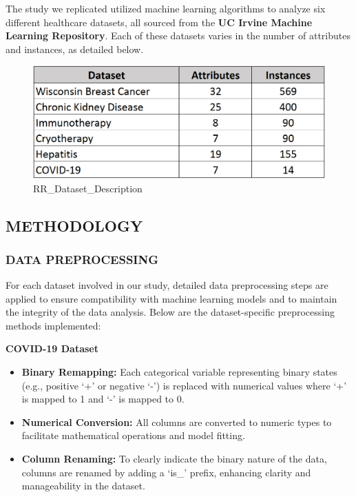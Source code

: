 \documentclass[11pt]{article}
\providecommand{\tightlist}{%
      \setlength{\itemsep}{0pt}\setlength{\parskip}{0pt}}
\begin{document}
    The study we replicated utilized machine learning algorithms to analyze
six different healthcare datasets, all sourced from the \textbf{UC
Irvine Machine Learning Repository}. Each of these datasets varies in
the number of attributes and instances, as detailed below.

    \begin{figure}
\centering
\includegraphics{images/RR_Dataset_Description.PNG}
\caption{RR\_Dataset\_Description}
\end{figure}

    \hypertarget{methodology}{%
\subsection{METHODOLOGY}\label{methodology}}

    \hypertarget{data-preprocessing}{%
\subsubsection{DATA PREPROCESSING}\label{data-preprocessing}}

    For each dataset involved in our study, detailed data preprocessing
steps are applied to ensure compatibility with machine learning models
and to maintain the integrity of the data analysis. Below are the
dataset-specific preprocessing methods implemented:

\textbf{COVID-19 Dataset}

\begin{itemize}
\tightlist
\item
  \textbf{Binary Remapping:} Each categorical variable representing
  binary states (e.g., positive `+' or negative `-') is replaced with
  numerical values where `+' is mapped to 1 and `-' is mapped to 0.
\item
  \textbf{Numerical Conversion:} All columns are converted to numeric
  types to facilitate mathematical operations and model fitting.
\item
  \textbf{Column Renaming:} To clearly indicate the binary nature of the
  data, columns are renamed by adding a `is\_' prefix, enhancing clarity
  and manageability in the dataset.
\end{itemize}
\end{document}
